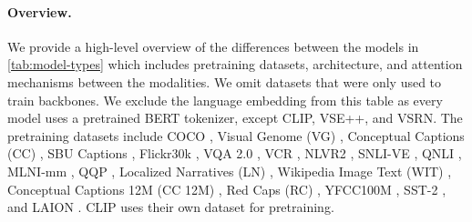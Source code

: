 \paragraph{Overview.}
We provide a high-level overview of the differences between the models in \cref{tab:model-types} which includes pretraining datasets, architecture, and attention mechanisms between the modalities. We omit datasets that were only used to train backbones. We exclude the language embedding from this table as every model uses a pretrained BERT tokenizer, except CLIP, VSE++, and VSRN. The pretraining datasets include COCO \cite{lin2014microsoft}, Visual Genome (VG) \cite{krishna2016visual}, Conceptual Captions (CC) \cite{sharma2018conceptual}, SBU Captions \cite{ordonez2011im2text}, Flickr30k \cite{young2014image}, VQA 2.0 \cite{goyal2017making}, VCR \cite{zellers2019recognition}, NLVR2 \cite{suhr2017corpus}, SNLI-VE \cite{xie2018visual}, QNLI \cite{rajpurkar2016squad}, MLNI-mm \cite{williams2017broad}, QQP \cite{QQPDataset}, Localized Narratives (LN) \cite{pont-tuset2020localized-narratives}, Wikipedia Image Text (WIT) \cite{srinivasan2021wit}, Conceptual Captions 12M (CC 12M) \cite{changpinyo2021conceptual12m}, Red Caps (RC) \cite{desai2021redcaps}, YFCC100M \cite{thomee2016yfcc100m}, SST-2 \cite{Socher2013RecursiveDM}, and LAION \cite{schuhmann2021laion}. CLIP uses their own dataset for pretraining.

